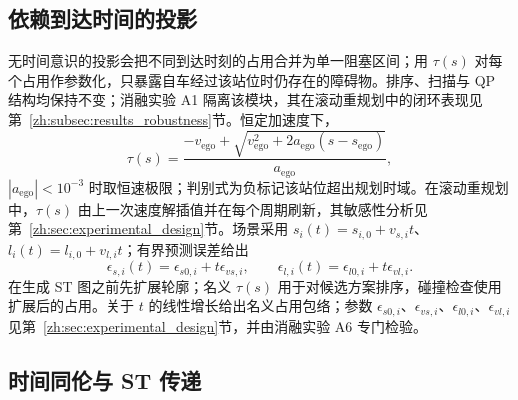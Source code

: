 \subsection{依赖到达时间的投影}
\label{zh:sec:method_projection}

无时间意识的投影会把不同到达时刻的占用合并为单一阻塞区间；用 $\tau(s)$ 对每个占用作参数化，只暴露自车经过该站位时仍存在的障碍物。排序、扫描与 QP 结构均保持不变；消融实验 A1 隔离该模块，其在滚动重规划中的闭环表现见第~\ref{zh:subsec:results_robustness}节。恒定加速度下，
\begin{equation}
 \tau(s)=\frac{-v_{\mathrm{ego}}+\sqrt{v_{\mathrm{ego}}^2+2a_{\mathrm{ego}}(s-s_{\mathrm{ego}})}}{a_{\mathrm{ego}}},
 \label{zh:eq:arrival_time}
\end{equation}
$|a_{\mathrm{ego}}|<10^{-3}$ 时取恒速极限；判别式为负标记该站位超出规划时域。在滚动重规划中，$\tau(s)$ 由上一次速度解插值并在每个周期刷新，其敏感性分析见第~\ref{zh:sec:experimental_design}节。场景采用 $s_i(t)=s_{i,0}+v_{s,i}t$、$l_i(t)=l_{i,0}+v_{l,i}t$；有界预测误差给出
\begin{equation}
 \epsilon_{s,i}(t)=\epsilon_{s0,i}+t\epsilon_{vs,i},\qquad
 \epsilon_{l,i}(t)=\epsilon_{l0,i}+t\epsilon_{vl,i}.
 \label{zh:eq:prediction_tube}
\end{equation}
在生成 ST 图之前先扩展轮廓；名义 $\tau(s)$ 用于对候选方案排序，碰撞检查使用扩展后的占用。关于 $t$ 的线性增长给出名义占用包络；参数 $\epsilon_{s0,i}$、$\epsilon_{vs,i}$、$\epsilon_{l0,i}$、$\epsilon_{vl,i}$ 见第~\ref{zh:sec:experimental_design}节，并由消融实验 A6 专门检验。

\subsection{时间同伦与 ST 传递}
\label{zh:sec:method_temporal}

